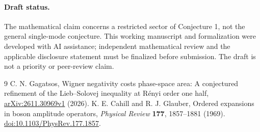 \documentclass[11pt]{article}
\begin{document}
\paragraph{Draft status.} The mathematical claim concerns a restricted sector of Conjecture 1, not the general single-mode conjecture. This working manuscript and formalization were developed with AI assistance; independent mathematical review and the applicable disclosure statement must be finalized before submission. The draft is not a priority or peer-review claim.

\begin{thebibliography}{9}
 C. N. Gagatsos, Wigner negativity costs phase-space area: A conjectured refinement of the Lieb--Solovej inequality at R\'enyi order one half, \href{https://arxiv.org/abs/2611.30969}{arXiv:2611.30969v1} (2026).
 K. E. Cahill and R. J. Glauber, Ordered expansions in boson amplitude operators, \emph{Physical Review} \textbf{177}, 1857--1881 (1969). \href{https://doi.org/10.1103/PhysRev.177.1857}{doi:10.1103/PhysRev.177.1857}.
\end{thebibliography}
\end{document}
